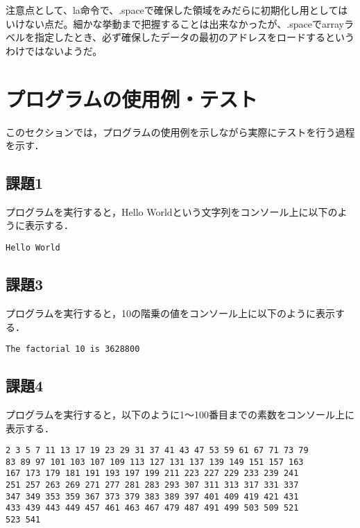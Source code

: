 \documentclass[a4j]{jarticle}
\begin{document}
注意点として、la命令で、.spaceで確保した領域をみだらに初期化し用としてはいけない点だ。細かな挙動まで把握することは出来なかったが、.spaceでarrayラベルを指定したとき、必ず確保したデータの最初のアドレスをロードするというわけではないようだ。


%
%

\section{プログラムの使用例・テスト}

このセクションでは，プログラムの使用例を示しながら実際にテストを行う過程を示す．

\subsection{課題1}

プログラムを実行すると，Hello Worldという文字列をコンソール上に以下のように表示する．

{\baselineskip 3mm
\begin{verbatim}
Hello World
\end{verbatim}
}


\subsection{課題3}

プログラムを実行すると，10の階乗の値をコンソール上に以下のように表示する．

{\baselineskip 3mm
\begin{verbatim}
The factorial 10 is 3628800
\end{verbatim}
}


\subsection{課題4}

プログラムを実行すると，以下のように1〜100番目までの素数をコンソール上に表示する．  

{\baselineskip 3mm
\begin{verbatim}
2 3 5 7 11 13 17 19 23 29 31 37 41 43 47 53 59 61 67 71 73 79 
83 89 97 101 103 107 109 113 127 131 137 139 149 151 157 163 
167 173 179 181 191 193 197 199 211 223 227 229 233 239 241 
251 257 263 269 271 277 281 283 293 307 311 313 317 331 337 
347 349 353 359 367 373 379 383 389 397 401 409 419 421 431 
433 439 443 449 457 461 463 467 479 487 491 499 503 509 521 
523 541 
\end{verbatim}
}
\end{document}
